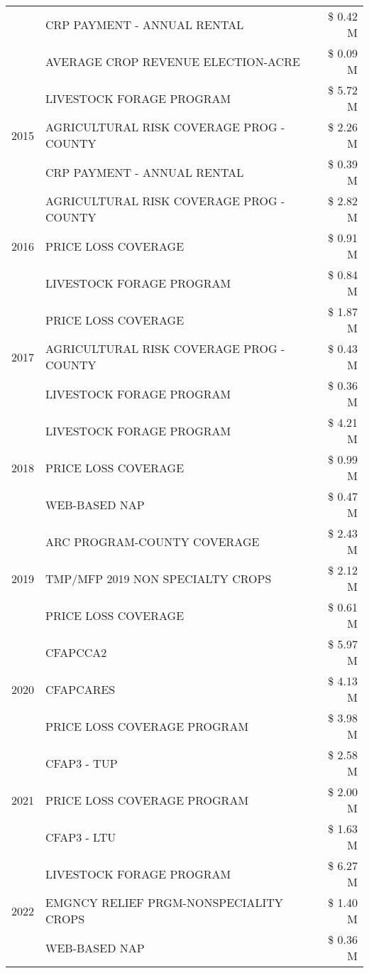 \begin{tabular}{llr}
 & CRP PAYMENT - ANNUAL RENTAL & \$ 0.42 M \\
 & AVERAGE CROP REVENUE ELECTION-ACRE & \$ 0.09 M \\
\cline{1-3}
\multirow[t]{3}{*}{2015} & LIVESTOCK FORAGE PROGRAM & \$ 5.72 M \\
 & AGRICULTURAL RISK COVERAGE PROG - COUNTY & \$ 2.26 M \\
 & CRP PAYMENT - ANNUAL RENTAL & \$ 0.39 M \\
\cline{1-3}
\multirow[t]{3}{*}{2016} & AGRICULTURAL RISK COVERAGE PROG - COUNTY & \$ 2.82 M \\
 & PRICE LOSS COVERAGE & \$ 0.91 M \\
 & LIVESTOCK FORAGE PROGRAM & \$ 0.84 M \\
\cline{1-3}
\multirow[t]{3}{*}{2017} & PRICE LOSS COVERAGE & \$ 1.87 M \\
 & AGRICULTURAL RISK COVERAGE PROG - COUNTY & \$ 0.43 M \\
 & LIVESTOCK FORAGE PROGRAM & \$ 0.36 M \\
\cline{1-3}
\multirow[t]{3}{*}{2018} & LIVESTOCK FORAGE PROGRAM & \$ 4.21 M \\
 & PRICE LOSS COVERAGE & \$ 0.99 M \\
 & WEB-BASED NAP & \$ 0.47 M \\
\cline{1-3}
\multirow[t]{3}{*}{2019} & ARC PROGRAM-COUNTY COVERAGE & \$ 2.43 M \\
 & TMP/MFP 2019 NON SPECIALTY CROPS & \$ 2.12 M \\
 & PRICE LOSS COVERAGE & \$ 0.61 M \\
\cline{1-3}
\multirow[t]{3}{*}{2020} & CFAPCCA2 & \$ 5.97 M \\
 & CFAPCARES & \$ 4.13 M \\
 & PRICE LOSS COVERAGE PROGRAM & \$ 3.98 M \\
\cline{1-3}
\multirow[t]{3}{*}{2021} & CFAP3 - TUP & \$ 2.58 M \\
 & PRICE LOSS COVERAGE PROGRAM & \$ 2.00 M \\
 & CFAP3 - LTU & \$ 1.63 M \\
\cline{1-3}
\multirow[t]{3}{*}{2022} & LIVESTOCK FORAGE PROGRAM & \$ 6.27 M \\
 & EMGNCY RELIEF PRGM-NONSPECIALITY CROPS & \$ 1.40 M \\
 & WEB-BASED NAP & \$ 0.36 M \\
\cline{1-3}
\bottomrule
\end{tabular}
